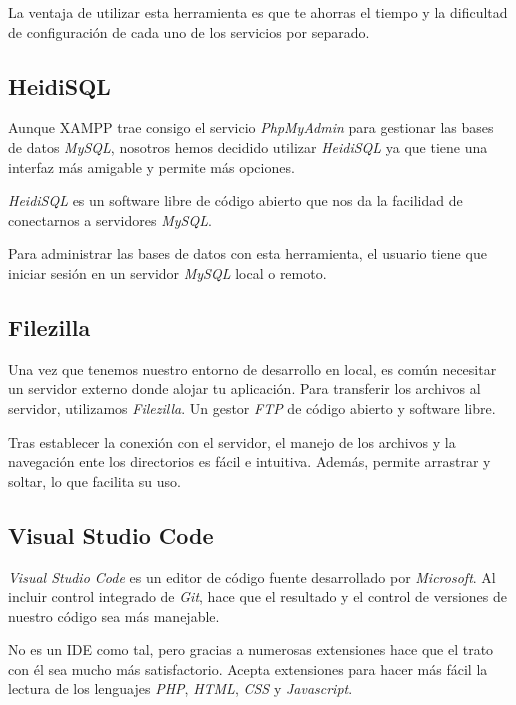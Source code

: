 La ventaja de utilizar esta herramienta es que te ahorras el tiempo y la dificultad de configuración de cada uno de los servicios por separado. 

\subsection{HeidiSQL}

Aunque XAMPP trae consigo el servicio \textit{PhpMyAdmin} para gestionar las bases de datos \textit{MySQL}, nosotros hemos decidido utilizar \textit{HeidiSQL} ya que tiene una interfaz más amigable y permite más opciones.

\textit{HeidiSQL} es un software libre de código abierto que nos da la facilidad de conectarnos a servidores \textit{MySQL}.

Para administrar las bases de datos con esta herramienta, el usuario tiene que iniciar sesión en un servidor \textit{MySQL} local o remoto. 

\subsection{Filezilla}

Una vez que tenemos nuestro entorno de desarrollo en local, es común necesitar un servidor externo donde alojar tu aplicación. Para transferir los archivos al servidor, utilizamos \textit{Filezilla}. Un gestor \textit{FTP} de código abierto y software libre.

Tras establecer la conexión con el servidor, el manejo de los archivos y la navegación ente los directorios es fácil e intuitiva. Además, permite arrastrar y soltar, lo que facilita su uso.

\subsection{Visual Studio Code}

\textit{Visual Studio Code} es un editor de código fuente desarrollado por \textit{Microsoft}. Al incluir control integrado de \textit{Git}, hace que el resultado y el control de versiones de nuestro código sea más manejable.

No es un IDE como tal, pero gracias a numerosas extensiones hace que el trato con él sea mucho más satisfactorio. Acepta extensiones para hacer más fácil la lectura de los lenguajes \textit{PHP}, \textit{HTML}, \textit{CSS} y \textit{Javascript}. 



